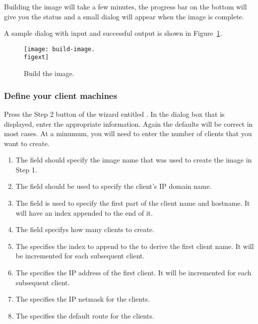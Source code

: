 Building the image will take a few minutes, the progress bar on the bottom 
will give you the status and a small dialog will appear when the image
is complete.
  
A sample dialog with input and successful output is
shown in Figure~\ref{fig:detailed-build-image}. 

\begin{figure}[htbp]
  \begin{center}
    \texttt{[image: build-image.\\figext]}
    \caption{Build the image.}
    \label{fig:detailed-build-image}
  \end{center}
\end{figure}
  
  
\subsubsection{Define your client machines} 

Press the Step 2 button of the wizard entitled . In the dialog box that is displayed, enter the
appropriate information. Again the defaults will be correct in most
cases. At a minumum, you will need to enter the number of clients that you want
to create.

\begin{enumerate}

\item The  field should specify the image name that was used to 
create the image in Step 1.

\item The  field should be used to specify the client's IP
domain name.

\item The  field is used to specify the first part of the 
client name and hostname. It will have an index appended to the end of it.

\item The  field specifys how many clients to create.

\item The  specifies the index to append
to the  to derive the first client name. It will be incremented
for each subsequent client.

\item The  specifies the IP address of the first client. It 
will be incremented for each subsequent client.

\item The  specifies the IP netmask for the clients.

\item The  specifies the default route for the clients.

\end{enumerate}
  
